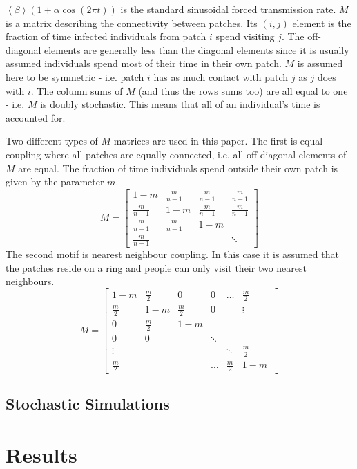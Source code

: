 \documentclass[twocolumn,nofootinbib,showkeys,twoside,floatfix,unsortedaddress,flushbottom,10pt,aps,pra]{report}
\begin{document}
$\left < \beta \right > (1+\alpha \cos(2\pi t))$ is the standard sinusoidal forced transmission rate. $M$ is a matrix describing the connectivity between patches. Its $(i,j)$ element is the fraction of time infected individuals from patch $i$ spend visiting $j$. The off-diagonal elements are generally less than the diagonal elements since it is usually assumed individuals spend most of their time in their own patch. $M$ is assumed here to be symmetric - i.e. patch $i$ has as much contact with patch $j$ as $j$ does with $i$. The column sums of $M$ (and thus the rows sums too) are all equal to one - i.e. $M$ is doubly stochastic. This means that all of an individual's time is accounted for. 
\par \smallskip \qquad
Two different types of $M$ matrices are used in this paper. The first is equal coupling where all patches are equally connected, i.e. all off-diagonal elements of $M$ are equal. The fraction of time individuals spend outside their own patch is given by the parameter $m$.
\[
M =
\begin{bmatrix}
  1-m & \frac{m}{n-1} & \frac{m}{n-1} & \frac{m}{n-1} \\
  \frac{m}{n-1} & 1-m & \frac{m}{n-1} & \frac{m}{n-1}  \\
  \frac{m}{n-1} & \frac{m}{n-1} & 1-m &  \\
  \frac{m}{n-1} &  &  & \ddots 
\end{bmatrix}
\]
The second motif is nearest neighbour coupling. In this case it is assumed that the patches reside on a ring and people can only visit their two nearest neighbours.
\[
M =
\begin{bmatrix}
  1-m & \frac{m}{2} & 0 & 0 & \dots & \frac{m}{2} \\
  \frac{m}{2} & 1-m & \frac{m}{2} & 0 & & \vdots \\
  0 & \frac{m}{2} & 1-m &  \\
  0 & 0 & & \ddots \\
  \vdots & & & & \ddots & \frac{m}{2} \\
  \frac{m}{2} &  & & \dots & \frac{m}{2} & 1-m \ 
\end{bmatrix}
\]

\subsection{Stochastic Simulations} 

\section{Results}
\end{document}
